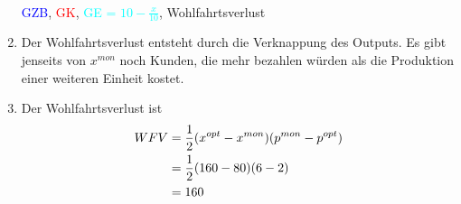 \documentclass{article}
\begin{document}
\begin{enumerate}[label=(\alph*)]
\begin{center}
 \\
			\textcolor{blue}{GZB}, \textcolor{red}{GK}, \textcolor{cyan}{GE = $10-\frac{x}{10}$}, \textcolor{green!80!black}{Wohlfahrtsverlust}
		\end{center}
		\item Der Wohlfahrtsverlust entsteht durch die Verknappung des Outputs. Es gibt jenseits von $x^{mon}$ noch Kunden, die mehr bezahlen würden als die Produktion einer weiteren Einheit kostet.
		\item Der Wohlfahrtsverlust ist
		\begin{align}
			WFV &= \frac{1}{2}(x^{opt}-x^{mon})(p^{mon}-p^{opt}) \notag \\
			&= \frac{1}{2}(160-80)(6-2) \notag \\
			&= 160 \notag
		\end{align}
	\end{enumerate}
	
\end{document}

